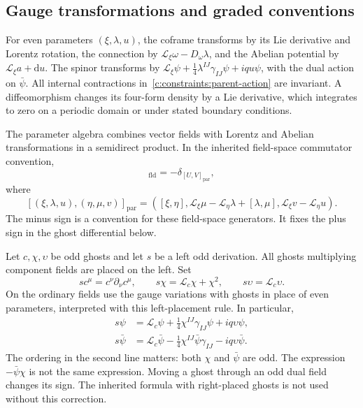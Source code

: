 \subsection{Gauge transformations and graded conventions}
For even parameters $(\xi,\lambda,u)$, the coframe transforms by its Lie derivative and Lorentz rotation, the connection by
$\mathcal L_\xi\omega-D_\omega\lambda$, and the Abelian potential by $\mathcal L_\xi a+\mathrm du$. The spinor transforms by
$\mathcal L_\xi\psi+\tfrac14\lambda^{IJ}\gamma_{IJ}\psi+iqu\psi$,
with the dual action on $\bar\psi$. All internal contractions in~\eqref{c:constraints:parent-action} are invariant. A diffeomorphism changes its four-form density by a Lie derivative, which integrates to zero on a periodic domain or under stated boundary conditions.

The parameter algebra combines vector fields with Lorentz and Abelian transformations in a semidirect product. In the inherited field-space commutator convention,
\begin{equation}
 [\delta_U,\delta_V]_{\mathrm{fld}}
       =-\delta_{\left[U,V\right]_{\mathrm{par}}},
\end{equation}
where
\begin{equation}
 \left[(\xi,\lambda,u),(\eta,\mu,v)\right]_{\mathrm{par}}
 =\left([\xi,\eta],\mathcal L_\xi\mu-\mathcal L_\eta\lambda+[\lambda,\mu],
                  \mathcal L_\xi v-\mathcal L_\eta u\right).
\end{equation}
The minus sign is a convention for these field-space generators. It fixes the plus sign in the ghost differential below.

Let $c,\chi,\upsilon$ be odd ghosts and let $s$ be a left odd derivation. All ghosts multiplying component fields are placed on the left. Set
\begin{equation}
 sc^\mu=c^\nu\partial_\nu c^\mu,\qquad
 s\chi=\mathcal L_c\chi+\chi^2,\qquad
 s\upsilon=\mathcal L_c\upsilon.
 \label{c:constraints:ghost-differential}
\end{equation}
On the ordinary fields use the gauge variations with ghosts in place of even parameters, interpreted with this left-placement rule. In particular,
\begin{align}
 s\psi&=\mathcal L_c\psi+\tfrac14\chi^{IJ}\gamma_{IJ}\psi+iq\upsilon\psi,\\
 s\bar\psi&=\mathcal L_c\bar\psi
                -\tfrac14\chi^{IJ}\bar\psi\gamma_{IJ}-iq\upsilon\bar\psi.
 \label{c:constraints:dual-ghost-action}
\end{align}
The ordering in the second line matters: both $\chi$ and $\bar\psi$ are odd. The expression $-\bar\psi\chi$ is not the same expression. Moving a ghost through an odd dual field changes its sign. The inherited formula with right-placed ghosts is not used without this correction.

